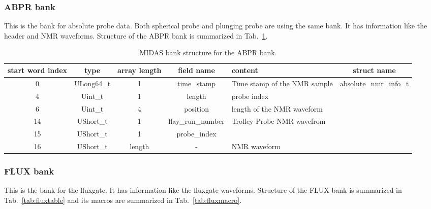 \subsubsection*{ABPR bank}

This is the bank for absolute probe data. Both spherical probe and plunging probe are using the same bank. It has information like the header and NMR waveforms. Structure of the ABPR bank is summarized in Tab.~\ref{tab:abprtable}.

\begin{table}[htbp]
\centering
\caption{MIDAS bank structure for the ABPR bank.}
\begin{tabular}{|c|c|c|c|p{3cm}|c|}
\hline
start word index & type       & array length & field name        & content                      & struct name \\
\hline
0                & ULong64\_t & 1            & time\_stamp       & Time stamp of the NMR sample & \multirow{5}{*}{absolute\_nmr\_info\_t}      \\
\cline{1-5}
4                & Uint\_t    & 1            & length            & probe index                  &                             \\
\cline{1-5}
6                & Uint\_t    & 4            & position          & length of the NMR waveform   &                             \\
\cline{1-5}
14               & UShort\_t  & 1            & flay\_run\_number & Trolley Probe NMR wavefrom   &                             \\
\cline{1-5}
15               & UShort\_t  & 1            & probe\_index      &                              &                             \\
\hline
16               & UShort\_t  & length       & -                 & NMR waveform\footnotemark &    \\
\hline
\end{tabular}
\label{tab:abprtable}
\end{table}

\subsubsection*{FLUX bank}

This is the bank for the fluxgate. It has information like the fluxgate waveforms. Structure of the FLUX bank is summarized in Tab.~\ref{tab:fluxtable} and its macros are summarized in Tab.~\ref{tab:fluxmacro}.

